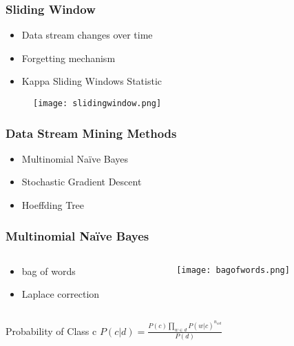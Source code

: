 \begin{frame}
	\frametitle{Sliding Window}
	\begin{itemize}
		\item Data stream changes over time
		\item Forgetting mechanism
		\item Kappa Sliding Windows Statistic
	\end{itemize}
	\begin{figure}
		\centering
		\texttt{[image: slidingwindow.png]}
	\end{figure}
\end{frame}

\begin{frame}
	\frametitle{Data Stream Mining Methods}
	\begin{itemize}
		\item Multinomial Naïve Bayes
		\item Stochastic Gradient Descent
		\item Hoeffding Tree
	\end{itemize}
\end{frame}

\begin{frame}
	\frametitle{Multinomial Naïve Bayes}
\begin{columns}
	\begin{column}{0.3\textwidth}
		\begin{itemize}
			\item bag of words
			\item Laplace correction
		\end{itemize}
	\end{column}
	\begin{column}{0.7\textwidth}  %
		\begin{figure}
			\centering
			\texttt{[image: bagofwords.png]}
		\end{figure}
	\end{column}
\end{columns}


	\begin{block}{Probability of Class c}
		\centering
		$P(c|d) = \frac{P(c) \prod_{w\in d}P(w|c)^{n_{wd}}}{P(d)}$
	\end{block}
\end{frame}

